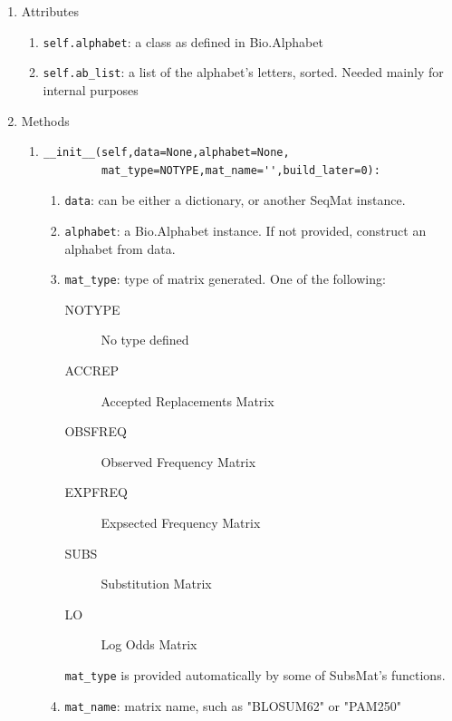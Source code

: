 \documentclass{report}
\begin{document}
\begin{enumerate}
  \item Attributes
  \begin{enumerate}
    \item \verb|self.alphabet|: a class as defined in Bio.Alphabet

    \item \verb|self.ab_list|: a list of the alphabet's letters, sorted. Needed mainly for internal purposes
  \end{enumerate}

  \item Methods

  \begin{enumerate}

    \item
\begin{verbatim}
__init__(self,data=None,alphabet=None,
         mat_type=NOTYPE,mat_name='',build_later=0):
\end{verbatim}

    \begin{enumerate}

      \item \verb|data|: can be either a dictionary, or another SeqMat instance.
      \item \verb|alphabet|: a Bio.Alphabet instance. If not provided, construct an alphabet from data.

      \item \verb|mat_type|: type of matrix generated. One of the following:

      \begin{description}
        \item[NOTYPE]     No type defined
        \item[ACCREP]     Accepted Replacements Matrix
        \item[OBSFREQ]    Observed Frequency Matrix
        \item[EXPFREQ]    Expsected Frequency Matrix
        \item[SUBS]       Substitution Matrix      
        \item[LO]         Log Odds Matrix
      \end{description}

      \verb|mat_type| is provided automatically by some of SubsMat's functions.

      \item \verb|mat_name|: matrix name, such as "BLOSUM62" or "PAM250"


\end{enumerate}
\end{enumerate}
\end{enumerate}
\end{document}
